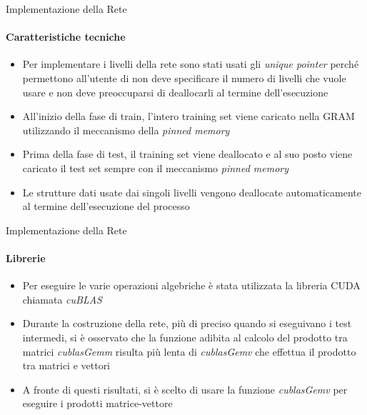 \documentclass[
 ]{beamer}
\begin{document}
\begin{frame}{Implementazione della Rete}
    \framesubtitle{Caratteristiche tecniche}
      \begin{itemize} [<+->] 
        \setlength\itemsep{1em}           
            \item \large Per implementare i livelli della rete sono stati usati gli \emph{unique pointer} perché permettono all'utente di non deve specificare il numero di livelli che vuole usare e non deve preoccuparsi di deallocarli al termine dell'esecuzione           
            \item \large All'inizio della fase di train, l'intero training set viene caricato nella GRAM utilizzando il meccanismo della \emph{pinned memory}
             \item \large Prima della fase di test, il training set viene deallocato e al suo posto viene caricato il test set sempre con il meccanismo \emph{pinned memory}
            \item \large Le strutture dati usate dai singoli livelli vengono deallocate automaticamente al termine dell'esecuzione del processo
        \end{itemize}
\end{frame}

\begin{frame}{Implementazione della Rete}
    \framesubtitle{Librerie}
      \begin{itemize} [<+->] 
        \setlength\itemsep{1em}           
            \item \large Per eseguire le varie operazioni algebriche è stata utilizzata la libreria CUDA chiamata \emph{cuBLAS}
            \item \large Durante la costruzione della rete, più di preciso quando si eseguivano i test intermedi, si è osservato che la funzione adibita al calcolo del prodotto tra matrici \emph{cublasGemm} risulta più lenta di \emph{cublasGemv} che effettua il prodotto tra matrici e vettori
            \item \large A fronte di questi risultati, si è scelto di usare la funzione \emph{cublasGemv} per eseguire i prodotti matrice-vettore
        \end{itemize}
\end{frame}
\end{document}
